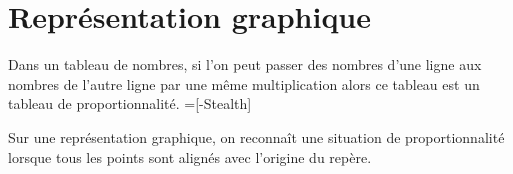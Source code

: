 \section{Représentation graphique}
\begin{remarque}
    Dans un tableau de nombres, si l'on peut passer des nombres d'une ligne aux nombres de l'autre ligne par une même multiplication alors ce tableau est un tableau de proportionnalité.    
    =[-{Stealth}]
    \vspace*{-7mm}
    \begin{center}
    \end{center}
\end{remarque}
\vspace*{-10mm}
\begin{propriete}[\admise]
    Sur une représentation graphique, on reconnaît une situation de proportionnalité lorsque tous les points sont alignés avec l'origine du repère.
\end{propriete}

